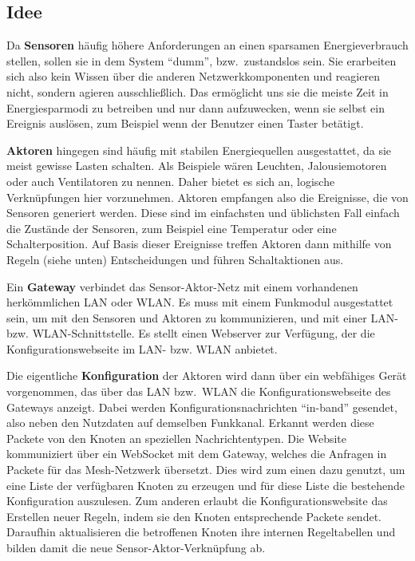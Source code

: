 \documentclass[conference]{IEEEtran}
\begin{document}
    \subsection{Idee}
        Da \textbf{Sensoren} häufig höhere Anforderungen an einen sparsamen
        Energieverbrauch stellen, sollen sie in dem System \enquote{dumm}, bzw.\ zustandslos sein.
        Sie erarbeiten sich also kein Wissen über die anderen Netzwerkkomponenten
        und reagieren nicht, sondern agieren ausschließlich.
        Das ermöglicht uns sie die meiste Zeit in Energiesparmodi zu betreiben
        und nur dann aufzuwecken, wenn sie selbst ein Ereignis auslösen,
        zum Beispiel wenn der Benutzer einen Taster betätigt.

        \textbf{Aktoren} hingegen sind häufig mit stabilen Energiequellen
        ausgestattet, da sie meist gewisse Lasten schalten.
        Als Beispiele wären Leuchten, Jalousiemotoren oder auch Ventilatoren
        zu nennen.
        Daher bietet es sich an, logische Verknüpfungen hier vorzunehmen.
        Aktoren empfangen also die Ereignisse, die von Sensoren generiert werden.
        Diese sind im einfachsten und üblichsten Fall einfach die Zustände
        der Sensoren, zum Beispiel eine Temperatur oder eine Schalterposition.
        Auf Basis dieser Ereignisse treffen Aktoren dann mithilfe von
        Regeln (siehe unten) Entscheidungen und führen Schaltaktionen aus.

        Ein \textbf{Gateway} verbindet das Sensor-Aktor-Netz mit einem
        vorhandenen herkömmlichen \ac{LAN} oder \ac{WLAN}.
        Es muss mit einem Funkmodul ausgestattet sein,
        um mit den Sensoren und Aktoren zu kommunizieren,
        und mit einer \ac{LAN}- bzw. \ac{WLAN}-Schnittstelle.
        Es stellt einen Webserver zur Verfügung,
        der die Konfigurationswebseite im \ac{LAN}- bzw. \ac{WLAN} anbietet.

        Die eigentliche \textbf{Konfiguration} der Aktoren wird dann
        über ein webfähiges Gerät vorgenommen,
        das über das \ac{LAN} bzw.\ \ac{WLAN} die
        Konfigurationswebseite des Gateways anzeigt.
        Dabei werden Konfigurationsnachrichten \enquote{in-band} gesendet,
        also neben den Nutzdaten auf demselben Funkkanal. Erkannt werden
        diese Packete von den Knoten an speziellen Nachrichtentypen.
        Die Website kommuniziert über ein WebSocket mit dem Gateway, welches die Anfragen
        in Packete für das Mesh-Netzwerk übersetzt. Dies wird zum einen
        dazu genutzt, um eine Liste der verfügbaren Knoten zu erzeugen und für diese
        Liste die bestehende Konfiguration auszulesen. Zum anderen erlaubt die Konfigurationswebsite
        das Erstellen neuer Regeln, indem sie den Knoten entsprechende Packete sendet.
        Daraufhin aktualisieren die betroffenen Knoten ihre internen Regeltabellen und bilden
        damit die neue Sensor-Aktor-Verknüpfung ab.
\end{document}

